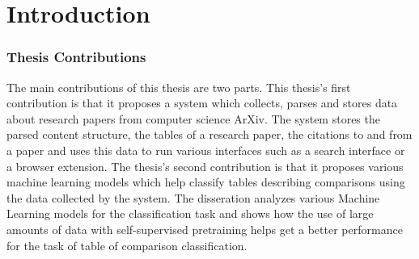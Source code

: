 \chapter{Introduction}



\subsection{Thesis Contributions}
The main contributions of this thesis are two parts. This thesis's first contribution is that it proposes a system which collects, parses and stores data about research papers from computer science ArXiv. The system stores the parsed content structure, the tables of a research paper, the citations to and from a paper and uses this data to run various interfaces such as a search interface or a browser extension.  The thesis's second contribution is that it proposes various machine learning models which help classify tables describing comparisons using the data collected by the system. The disseration analyzes various Machine Learning models for the classification task and shows how the use of large amounts of data with self-supervised pretraining helps get a better performance for the task of table of comparison classification.